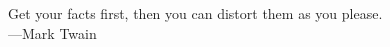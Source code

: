 \vspace*{\fill}
Get your facts first, then you can distort them as you please. \\ ---Mark Twain
\vspace*{\fill}
